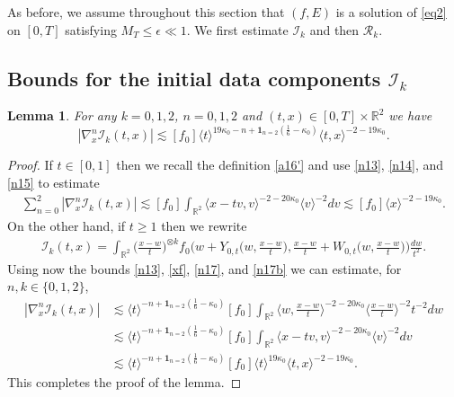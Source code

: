\documentclass[reqno,11pt]{amsart}
\numberwithin{equation}{section}
\def\R{{\mathbb R}}
\def\R{{\bf R}}
\def\R{\mathbb{R}}
\newtheorem{lemma}[theorem]{Lemma}
\begin{document}
As before, we assume throughout this section that $(f,E)$ is a solution
of \eqref{eq2} on $[0,T]$ satisfying $M_T\leq\epsilon\ll1$. We first
estimate $\mathcal I_k$ and then $\mathcal R_k$.
	
	
	\subsection{Bounds for the initial data components $\mathcal{I}_k$}
	
	\begin{lemma}\label{estI_k} For any $k=0,1,2$, $n=0,1,2$ and $(t,x)\in[0,T]\times\mathbb{R}^2$ we have
		\begin{equation}\label{Z16-new}
			|\nabla_x^n\mathcal{I}_k(t,x)|\lesssim [f_0]\langle t\rangle^{19\kappa_0-n+\mathbf{1}_{n=2}(\frac16-\kappa_0)}
			\langle t,x\rangle^{-2-19\kappa_0}.
		\end{equation}
	\end{lemma}
	
	\begin{proof} If $t\in [0,1]$ then we recall the definition \eqref{a16'} and use \eqref{n13}, \eqref{n14}, and \eqref{n15} to estimate
		\begin{align*}
			\sum_{ n=0}^2|\nabla_{x}^n\mathcal{I}_k(t,x)|\lesssim [f_0]\int_{\mathbb{R}^2}\langle x-tv,v\rangle^{-2-20\kappa_0}\langle v\rangle^{-2}dv\lesssim
			[f_0]\langle x\rangle^{-2-19\kappa_0}.
		\end{align*}
		On the other hand, if $t\geq 1$ then we rewrite
		\begin{align*}
			\mathcal{I}_k(t,x)=\int_{\R^2}\Big(\frac{x-w}{t}\Big)^{\otimes k} f_0\Big(w +Y_{0,t}\Big(w,\frac{x-w}{t}\Big), \frac{x-w}{t}+W_{0,t}\Big(w,\frac{x-w}{t}\Big)\Big)\frac{dw}{t^2}.
		\end{align*}
		Using now the bounds \eqref{n13}, \eqref{xf}, \eqref{n17}, and \eqref{n17b} we can estimate, for $n,k\in\{0,1,2\}$,
		\begin{equation*}
		\begin{split}
		|\nabla_{x}^n\mathcal{I}_k(t,x)|&\lesssim \langle t\rangle^{-n+\mathbf{1}_{n=2}(\frac{1}{6}-\kappa_0)}[f_0]\int_{\mathbb{R}^2}\Big\langle w,\frac{x-w}{t}\Big\rangle^{-2-20\kappa_0}\Big\langle \frac{x-w}{t}\Big\rangle^{-2} t^{-2}dw\\
		&\lesssim \langle t\rangle^{-n+\mathbf{1}_{n=2}(\frac{1}{6}-\kappa_0)}[f_0]\int_{\mathbb{R}^2}\langle x-tv,v\rangle^{-2-20\kappa_0}\langle v\rangle^{-2}dv\\
		&\lesssim \langle t\rangle^{-n+\mathbf{1}_{n=2}(\frac{1}{6}-\kappa_0)}[f_0]\langle t\rangle^{19\kappa_0}\langle t,x\rangle^{-2-19\kappa_0}.
		\end{split}
		\end{equation*}
		This completes the proof of the lemma. 
	\end{proof}
\end{document}
